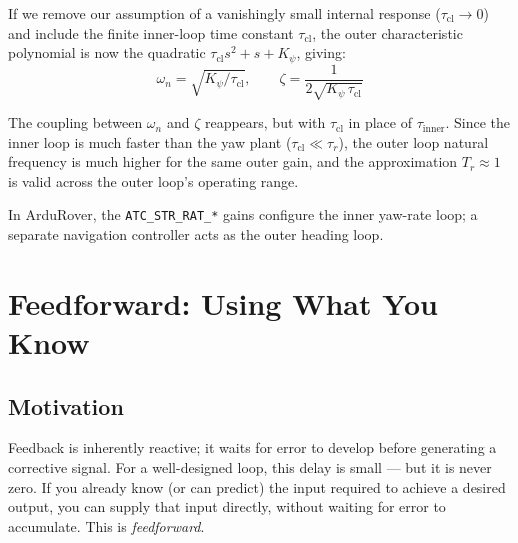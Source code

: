 \documentclass[12pt]{article}
\begin{document}
If we remove our assumption of a vanishingly small internal response ($\tau_{\mathrm{cl}} \to 0$) and include the finite inner-loop time constant $\tau_\mathrm{cl}$, the outer
characteristic polynomial is now the quadratic $\tau_\mathrm{cl} s^2 + s + K_\psi$, giving:
\[
  \omega_n = \sqrt{K_\psi/\tau_\mathrm{cl}}, \qquad
  \zeta = \frac{1}{2\sqrt{K_\psi\,\tau_\mathrm{cl}}}
\]

The coupling between $\omega_n$ and $\zeta$ reappears, but with $\tau_\mathrm{cl}$
in place of $\tau_{\mathrm{inner}}$.  Since the inner loop is much faster than the yaw plant
($\tau_\mathrm{cl} \ll \tau_r$), the outer loop natural frequency is much higher
for the same outer gain, and the approximation $T_r \approx 1$ is valid across
the outer loop's operating range.

In ArduRover, the \texttt{ATC\_STR\_RAT\_*} gains configure the inner yaw-rate
loop; a separate navigation controller acts as the outer heading loop.


\section{Feedforward: Using What You Know}
\label{sec:feedforward}

\subsection{Motivation}

Feedback is inherently reactive; it waits for error to develop before
generating a corrective signal.  For a well-designed loop, this delay is
small --- but it is never zero.  If you already know (or can predict) the input
required to achieve a desired output, you can supply that input directly,
without waiting for error to accumulate.  This is \emph{feedforward}.
\end{document}
